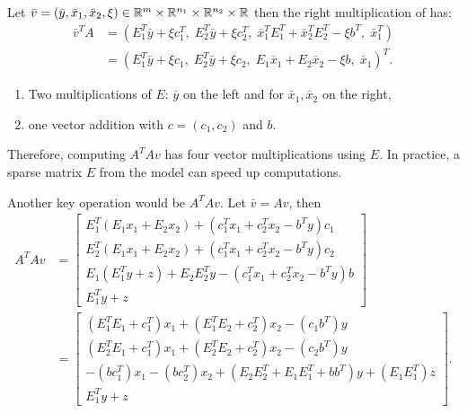 \documentclass[12pt]{report}
\begin{document}
            Let $\bar v = (\bar y, \bar x_1, \bar x_2, \xi) \in \mathbb R^m\times \mathbb R^{n_1} \times \mathbb R^{n_2}\times \mathbb R$ then the right multiplication of has: 
            \begin{align*}
                \bar v^TA  &= (
                    E_1^T\bar y + \xi c_1^T,\; E_2^T\bar y + \xi c_2^T,\; 
                    \bar x_1^TE_1^T + \bar x_2^TE_2^T - \xi b^T,\; \bar x_1^T
                )
                \\
                &= 
                (
                    E_1^T\bar y + \xi c_1, \;
                    E_2^T \bar y + \xi c_2, \;
                    E_1\bar x_1 + E_2\bar x_2 - \xi b, \;
                    \bar x_1
                )^T. 
            \end{align*}
            \begin{enumerate}
                \item Two multiplications of $E$: $\bar y$ on the left and for $\bar x_1, \bar x_2$ on the right, 
                \item one vector addition with $c = (c_1, c_2)$ and $b$. 
            \end{enumerate}
            Therefore, computing $A^TAv$ has four vector multiplications using $E$. 
            In practice, a sparse matrix $E$ from the model can speed up computations. 
            \par
            Another key operation would be $A^TAv$. 
            Let $\bar v = Av$, then 
            \begin{align*}
                A^TAv &= 
                \begin{bmatrix}
                    E^T_1(E_1x_1 + E_2x_2) + (c_1^Tx_1 + c_2^Tx_2 - b^Ty)c_1
                    \\
                    E^T_2(E_1x_1 + E_2x_2) + (c_1^Tx_1 + c_2^Tx_2 - b^Ty)c_2
                    \\
                    E_1(E_1^Ty + z) + E_2E_2^Ty - (c_1^Tx_1 + c_2^Tx_2 - b^Ty)b
                    \\
                    E_1^Ty + z
                \end{bmatrix}
                \\
                &= 
                \begin{bmatrix}
                    (E_1^TE_1 + c_1^T)x_1 + (E_1^TE_2 + c_2^T)x_2 - (c_1b^T)y
                    \\
                    (E_2^TE_1 + c_1^T)x_1 + (E_2^TE_2 + c_2^T)x_2 - (c_2b^T)y
                    \\
                    -(bc_1^T)x_1 - (bc_2^T)x_2 + (E_2E_2^T + E_1E_1^T + bb^T)y
                    + (E_1E_1^T)z
                    \\
                    E_1^Ty + z
                \end{bmatrix}. 
            \end{align*}
\end{document}
